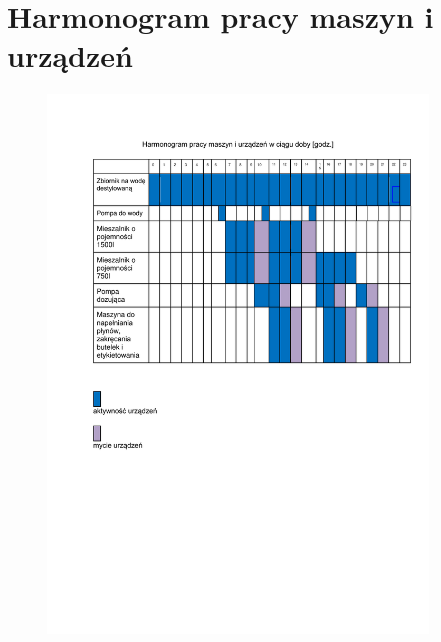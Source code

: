\section{Harmonogram pracy maszyn i urządzeń}

\begin{figure}[h]
	\centering
	\includegraphics[width=0.9\textwidth]{./sec15/harmonogram_maszyny.pdf}
\end{figure}

